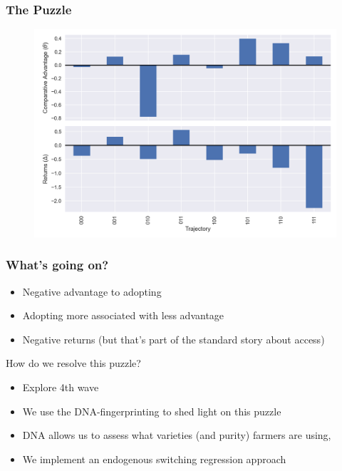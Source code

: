 \documentclass{beamer}
\begin{document}
\begin{frame}
\frametitle{The Puzzle}

\begin{figure}
    \centering
    \includegraphics[scale=0.5]{results/figures/theta.png}\label{fig:theta_delta_raw}
\end{figure}
 
\end{frame}


\begin{frame}
\frametitle{What's going on?}

\begin{itemize}
    \item Negative advantage to adopting
    \item Adopting more associated with less advantage
    \item Negative returns (but that's part of the standard story about access)
\end{itemize}

\end{frame}

\begin{frame}{How do we resolve this puzzle?}
\begin{itemize}
    \item Explore 4th wave
    \item We use the DNA-fingerprinting to shed light on this puzzle
    \item DNA allows us to assess what varieties (and purity) farmers are using, 
    \item We implement an endogenous switching regression approach
\end{itemize}


\end{frame}
\end{document}
